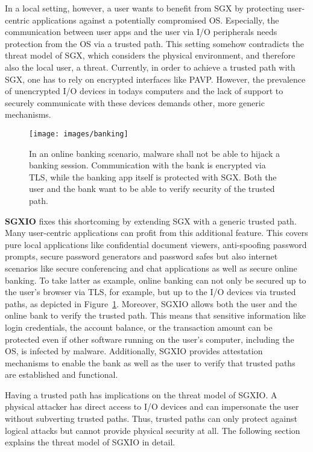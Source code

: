 \documentclass{sig-alternate-05-2015}
\begin{document}
In a local setting, however, a user wants to benefit from SGX by protecting user-centric applications against a potentially compromised OS. 
Especially, the communication between user apps and the user via I/O peripherals needs protection from the OS via a trusted path. 
This setting somehow contradicts the threat model of SGX, which considers the physical environment, and therefore also the local user, a threat.  
Currently, in order to achieve a trusted path with SGX, one has to rely on encrypted interfaces like PAVP. 
However, the prevalence of unencrypted I/O devices in todays computers and the lack of support to securely communicate with these devices demands other, more generic mechanisms. 

\begin{figure}
\centering
\texttt{[image: images/banking]}
\caption{In an online banking scenario, malware shall not be able to hijack a banking session. 
Communication with the bank is encrypted via TLS, while the banking app itself is protected with SGX. 
Both the user and the bank want to be able to verify security of the trusted path. }
\label{fig:banking}
\end{figure}

\textbf{SGXIO} fixes this shortcoming by extending SGX with a generic trusted path. 
Many user-centric applications can profit from this additional feature. 
This covers pure local applications like confidential document viewers, anti-spoofing password prompts, secure password generators and password safes but also internet scenarios like secure conferencing and chat applications as well as secure online banking. 
To take latter as example, online banking can not only be secured up to the user's browser via TLS, for example, but up to the I/O devices via trusted paths, as depicted in Figure~\ref{fig:banking}. 
Moreover, SGXIO allows both the user and the online bank to verify the trusted path. 
This means that sensitive information like login credentials, the account balance, or the transaction amount can be protected even if other software running on the user's computer, including the OS, is infected by malware. 
Additionally, SGXIO provides attestation mechanisms to enable the bank as well as the user to verify that trusted paths are established and functional.

Having a trusted path has implications on the threat model of SGXIO. 
A physical attacker has direct access to I/O devices and can impersonate the user without subverting trusted paths. 
Thus, trusted paths can only protect against logical attacks but cannot provide physical security at all. 
The following section explains the threat model of SGXIO in detail.
\end{document}
